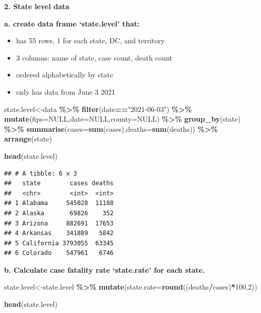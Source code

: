 \documentclass[
  openany]{book}
\newenvironment{Shaded}{\begin{snugshade}}{\end{snugshade}}
\newcommand{\AttributeTok}[1]{\textcolor[rgb]{0.13,0.29,0.53}{#1}}
\newcommand{\ConstantTok}[1]{\textcolor[rgb]{0.56,0.35,0.01}{#1}}
\newcommand{\DecValTok}[1]{\textcolor[rgb]{0.00,0.00,0.81}{#1}}
\newcommand{\FunctionTok}[1]{\textcolor[rgb]{0.13,0.29,0.53}{\textbf{#1}}}
\newcommand{\NormalTok}[1]{#1}
\newcommand{\OtherTok}[1]{\textcolor[rgb]{0.56,0.35,0.01}{#1}}
\newcommand{\SpecialCharTok}[1]{\textcolor[rgb]{0.81,0.36,0.00}{\textbf{#1}}}
\newcommand{\StringTok}[1]{\textcolor[rgb]{0.31,0.60,0.02}{#1}}
\providecommand{\tightlist}{%
  \setlength{\itemsep}{0pt}\setlength{\parskip}{0pt}}
\begin{document}
\textbf{2. State level data}

\textbf{a. create data frame `state.level' that:}

\begin{itemize}
\tightlist
\item
  has 55 rows, 1 for each state, DC, and territory
\item
  3 columns: name of state, case count, death count
\item
  ordered alphabetically by state
\item
  only has data from June 3 2021
\end{itemize}

\begin{Shaded}
\begin{Highlighting}[]
\NormalTok{state.level}\OtherTok{\textless{}{-}}\NormalTok{data }\SpecialCharTok{\%\textgreater{}\%} 
  \FunctionTok{filter}\NormalTok{(date}\SpecialCharTok{==}\StringTok{"2021{-}06{-}03"}\NormalTok{) }\SpecialCharTok{\%\textgreater{}\%} 
  \FunctionTok{mutate}\NormalTok{(}\AttributeTok{fips=}\ConstantTok{NULL}\NormalTok{,}\AttributeTok{date=}\ConstantTok{NULL}\NormalTok{,}\AttributeTok{county=}\ConstantTok{NULL}\NormalTok{) }\SpecialCharTok{\%\textgreater{}\%} 
  \FunctionTok{group\_by}\NormalTok{(state) }\SpecialCharTok{\%\textgreater{}\%} 
  \FunctionTok{summarise}\NormalTok{(}\AttributeTok{cases=}\FunctionTok{sum}\NormalTok{(cases),}\AttributeTok{deaths=}\FunctionTok{sum}\NormalTok{(deaths)) }\SpecialCharTok{\%\textgreater{}\%} 
  \FunctionTok{arrange}\NormalTok{(state)}

\FunctionTok{head}\NormalTok{(state.level)}
\end{Highlighting}
\end{Shaded}

\begin{verbatim}
## # A tibble: 6 x 3
##   state        cases deaths
##   <chr>        <int>  <int>
## 1 Alabama     545028  11188
## 2 Alaska       69826    352
## 3 Arizona     882691  17653
## 4 Arkansas    341889   5842
## 5 California 3793055  63345
## 6 Colorado    547961   6746
\end{verbatim}

\textbf{b. Calculate case fatality rate `state.rate' for each state.}

\begin{Shaded}
\begin{Highlighting}[]
\NormalTok{state.level}\OtherTok{\textless{}{-}}\NormalTok{state.level }\SpecialCharTok{\%\textgreater{}\%} 
  \FunctionTok{mutate}\NormalTok{(}\AttributeTok{state.rate=}\FunctionTok{round}\NormalTok{((deaths}\SpecialCharTok{/}\NormalTok{cases)}\SpecialCharTok{*}\DecValTok{100}\NormalTok{,}\DecValTok{2}\NormalTok{))}

\FunctionTok{head}\NormalTok{(state.level)}
\end{Highlighting}
\end{Shaded}
\end{document}

